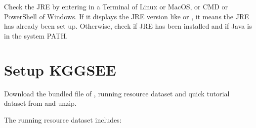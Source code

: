 \documentclass[letterpaper,10pt,english,openany,oneside]{sphinxmanual}
\begin{document}
\sphinxAtStartPar
Check the JRE by entering  in a Terminal of Linux or MacOS, or CMD or PowerShell of Windows. If it displays the JRE version like  or , it means the JRE has already been set up. Otherwise, check if JRE has been installed and if Java is in the system PATH.


\newpage
\section{Setup KGGSEE}
\label{\detokenize{setup:setup-kggsee}}
\sphinxAtStartPar
Download the bundled file of , running resource dataset and quick tutorial dataset from  and unzip.

\sphinxAtStartPar
The running resource dataset includes:
\end{document}
